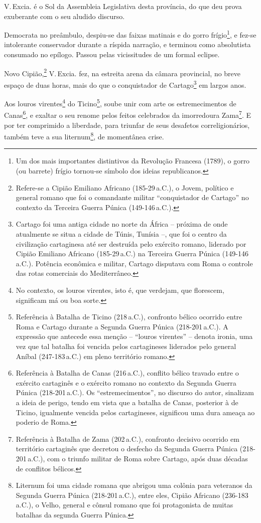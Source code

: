 V.\,Excia. é o Sol da Assembleia Legislativa desta província, do que deu
prova exuberante com o seu aludido discurso.

Democrata no preâmbulo, despiu-se das faixas matinais e do gorro
frígio\footnote{Um dos mais importantes distintivos da Revolução
  Francesa (1789), o gorro (ou barrete) frígio tornou-se símbolo dos
  ideias republicanos.\label{gorro}}, e fez-se intolerante conservador durante a
ríspida narração, e terminou como absolutista consumado no epílogo.
Passou pelas vicissitudes de um formal eclipse.

Novo Cipião,\footnote{Refere-se a Cipião Emiliano Africano (185-29\,a.C.), 
o Jovem, político e general romano que foi o comandante militar
  ``conquistador de Cartago'' no contexto da Terceira Guerra Púnica
  (149-146\,a.C.).} V.\,Excia. fez, na estreita arena da câmara
provincial, no breve espaço de duas horas, mais do que o conquistador de
Cartago\footnote{Cartago foi uma antiga cidade no norte da África --
  próxima de onde atualmente se situa a cidade de Túnis, Tunísia --, que
  foi o centro da civilização cartaginesa até ser destruída pelo
  exército romano, liderado por Cipião Emiliano Africano (185-29\,a.C.) na
  Terceira Guerra Púnica (149-146\,a.C.). Potência econômica e militar,
  Cartago disputava com Roma o controle das rotas comerciais do
  Mediterrâneo.} em largos anos.

Aos louros virentes\footnote{No contexto, os louros virentes, isto é,
  que verdejam, que florescem, significam má ou boa sorte.} do
Ticino\footnote{Referência à Batalha de Ticino (218\,a.C.), confronto
  bélico ocorrido entre Roma e Cartago durante a Segunda Guerra Púnica
  (218-201\,a.C.). A expressão que antecede essa menção -- ``louros
  virentes'' -- denota ironia, uma vez que tal batalha foi vencida pelos
  cartagineses liderados pelo general Aníbal (247-183\,a.C.) em
  pleno território romano.}, soube unir com arte os estremecimentos de
Canas\footnote{Referência à Batalha de Canas (216\,a.C.), conflito
  bélico travado entre o exército cartaginês e o exército romano no
  contexto da Segunda Guerra Púnica (218-201\,a.C.). Os ``estremecimentos'',
  no discurso do autor, sinalizam a ideia de perigo, tendo em vista que
  a batalha de Canas, posterior à de Ticino, igualmente vencida pelos
  cartagineses, significou uma dura ameaça ao poderio de Roma.}, e
exaltar o seu renome pelos feitos celebrados da imorredoura
Zama\footnote{Referência à Batalha de Zama (202\,a.C.), confronto
  decisivo ocorrido em território cartaginês que decretou o desfecho da
  Segunda Guerra Púnica (218-201\,a.C.), com o triunfo militar de Roma
  sobre Cartago, após duas décadas de conflitos bélicos.}. E por ter
comprimido a liberdade, para triunfar de seus desafetos
correligionários, também teve a sua liternum\footnote{Liternum foi uma
  cidade romana que abrigou uma colônia para veteranos da Segunda Guerra
  Púnica (218-201\,a.C.), entre eles, Cipião Africano (236-183\,a.C.), o
  Velho, general e cônsul romano que foi protagonista de muitas batalhas
  da segunda Guerra Púnica.}, de momentânea crise.

